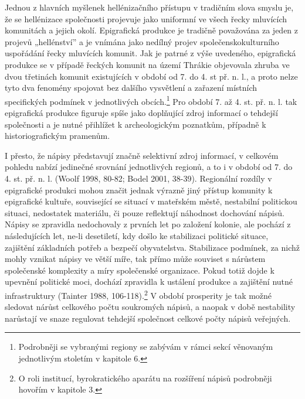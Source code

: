 Jednou z hlavních myšlenek hellénizačního přístupu v tradičním slova smyslu je, že se hellénizace společnosti projevuje jako uniformní ve všech řecky mluvících komunitách a jejich okolí. Epigrafická produkce je tradičně považována za jeden z projevů „hellénství” a je vnímána jako nedílný projev společenskokulturního uspořádání řecky mluvících komunit. Jak je patrné z výše uvedeného, epigrafická produkce se v případě řeckých komunit na území Thrákie objevovala zhruba ve dvou třetinách komunit existujících v období od 7. do 4. st př. n. l., a proto nelze tyto dva fenomény spojovat bez dalšího vysvětlení a zařazení místních specifických podmínek v jednotlivých obcích.\footnote{Podrobněji se vybranými regiony se zabývám v rámci sekcí věnovaným jednotlivým stoletím v kapitole 6.} Pro období 7. až 4. st. př. n. l. tak epigrafická produkce figuruje spíše jako doplňující zdroj informací o tehdejší společnosti a je nutné přihlížet k archeologickým poznatkům, případně k historiografickým pramenům.

I přesto, že nápisy představují značně selektivní zdroj informací, v celkovém pohledu nabízí jedinečné srovnání jednotlivých regionů, a to i v období od 7. do 4. st. př. n. l. (Woolf 1998, 80-82; Bodel 2001, 38-39). Regionální rozdíly v epigrafické produkci mohou značit jednak výrazně jiný přístup komunity k epigrafické kultuře, související se situací v mateřském městě, nestabilní politickou situaci, nedostatek materiálu, či pouze reflektují náhodnost dochování nápisů. Nápisy se zpravidla nedochovaly z prvních let po založení kolonie, ale pochází z následujících let, ne-li desetiletí, kdy došlo ke stabilizaci politické situace, zajištění základních potřeb a bezpečí obyvatelstva. Stabilizace podmínek, za nichž mohly vznikat nápisy ve větší míře, tak přímo může souviset s nárůstem společenské komplexity a míry společenské organizace. Pokud totiž dojde k upevnění politické moci, dochází zpravidla k ustálení produkce a zajištění nutné infrastruktury (Tainter 1988, 106-118).\footnote{O roli institucí, byrokratického aparátu na rozšíření nápisů podrobněji hovořím v kapitole 3.} V období prosperity je tak možné sledovat nárůst celkového počtu soukromých nápisů, a naopak v době nestability narůstají ve snaze regulovat tehdejší společnost celkové počty nápisů veřejných.

